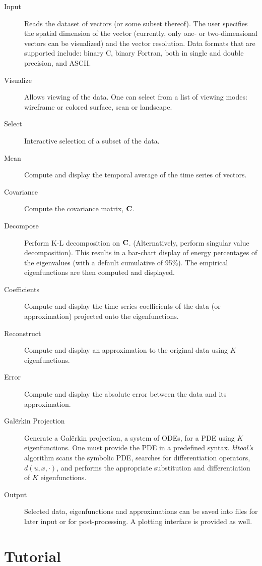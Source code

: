 \begin{description}
\item[Input] Reads the dataset of vectors (or some subset thereof).  
The user specifies the spatial dimension of the vector 
(currently, only one- or two-dimensional vectors can be visualized)
and the vector resolution. Data formats that are supported include:
binary C, binary Fortran, both in single and double precision, and ASCII.
\item[Visualize] Allows viewing of the data.  One can select from a
list of viewing modes: wireframe or colored surface, scan or landscape.
\item[Select] Interactive selection of a subset of the data.
\item[Mean] Compute and display the temporal average of the time series of
vectors.
\item[Covariance] Compute the covariance matrix, ${\bf C}$.
\item[Decompose] Perform K-L decomposition 
on ${\bf C}$.  (Alternatively, perform singular value decomposition). 
This results in a bar-chart display of energy percentages
of the eigenvalues (with a default cumulative of 95\%).
The empirical eigenfunctions are then computed and displayed.
\item[Coefficients] Compute and display the time series coefficients of the
data (or approximation) projected onto the eigenfunctions.
\item[Reconstruct] Compute and display an approximation to the original
data using $K$ eigenfunctions.
\item[Error] Compute and display the absolute error between the data and its
approximation.
\item[Gal\"{e}rkin Projection] Generate a Gal\"{e}rkin projection,
a system of ODEs, for a PDE
using $K$ eigenfunctions.  One must provide the PDE in a predefined syntax.
{\em kltool's} algorithm scans the symbolic PDE, 
searches for differentiation operators, $d(u,x,\cdot)$, and performs
the appropriate substitution and differentiation of $K$ eigenfunctions.
\item[Output] Selected data, eigenfunctions and approximations can be
saved into files for later input or for post-processing. 
A plotting interface is provided as well. 
\end{description}
\newpage
\section{Tutorial}

